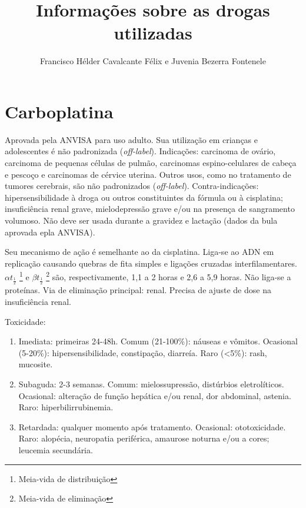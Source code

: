 \documentclass[graybox]{svmult}
\begin{document}
\title*{Informações sobre as drogas utilizadas}
\author{Francisco Hélder Cavalcante Félix e Juvenia Bezerra Fontenele}
%
%
\maketitle

\abstract{}

\section{Carboplatina}

Aprovada pela ANVISA para uso adulto. Sua utilização em crianças e adolescentes é não padronizada (\textit{off-label}). Indicações: carcinoma de ovário, carcinoma de pequenas células de pulmão, carcinomas espino-celulares de cabeça e pescoço e carcinomas de cérvice uterina. Outros usos, como no tratamento de tumores cerebrais, são não padronizados (\textit{off-label}). Contra-indicações: hipersensibilidade à droga ou outros constituintes da fórmula ou à cisplatina; insuficiência renal grave, mielodepressão grave e/ou na presença de sangramento volumoso. Não deve ser usada durante a gravidez e lactação (dados da bula aprovada epla ANVISA).

Seu mecanismo de ação é semelhante ao da cisplatina. Liga-se ao ADN em replicação causando quebras de fita simples e ligações cruzadas interfilamentares. \(\alpha t_\frac{1}{2}\) \footnote{Meia-vida de distribuição} e \(\beta t_\frac{1}{2}\) \footnote{Meia-vida de eliminação} são, respectivamente, 1,1 a 2 horas e 2,6 a 5,9 horas. Não liga-se a proteínas. Via de eliminação principal: renal. Precisa de ajuste de dose na insuficiência renal.

Toxicidade:
\renewcommand{\labelenumi}{\Alph{enumi}}
\begin{enumerate}
	\item Imediata: primeiras 24-48h. Comum (21-100\%): náuseas e vômitos. Ocasional (5-20\%): hipersensibilidade, constipação, diarreía. Raro (<5\%): rash, mucosite.
	\item Subaguda: 2-3 semanas. Comum: mielossupressão, distúrbios eletrolíticos. Ocasional: alteração de função hepática e/ou renal, dor abdominal, astenia. Raro: hiperbilirrubinemia.
	\item Retardada: qualquer momento após tratamento. Ocasional: ototoxicidade. Raro: alopécia, neuropatia periférica, amaurose noturna e/ou a cores; leucemia secundária.
\end{enumerate}
\end{document}
